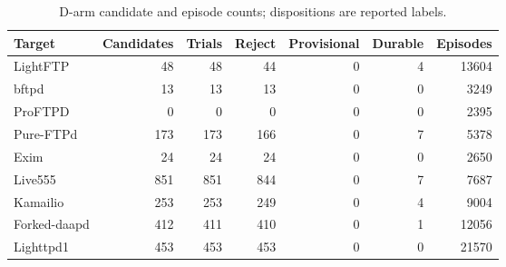 \begin{table}[!tbp]
\centering\small
\caption{D-arm candidate and episode counts; dispositions are reported labels.}
\label{tab:observed_log_counts}
\begin{tabular}{lrrrrrr}
\toprule
Target & Candidates & Trials & Reject & Provisional & Durable & Episodes \\
\midrule
LightFTP & 48 & 48 & 44 & 0 & 4 & 13604 \\
bftpd & 13 & 13 & 13 & 0 & 0 & 3249 \\
ProFTPD & 0 & 0 & 0 & 0 & 0 & 2395 \\
Pure-FTPd & 173 & 173 & 166 & 0 & 7 & 5378 \\
Exim & 24 & 24 & 24 & 0 & 0 & 2650 \\
Live555 & 851 & 851 & 844 & 0 & 7 & 7687 \\
Kamailio & 253 & 253 & 249 & 0 & 4 & 9004 \\
Forked-daapd & 412 & 411 & 410 & 0 & 1 & 12056 \\
Lighttpd1 & 453 & 453 & 453 & 0 & 0 & 21570 \\
\bottomrule
\end{tabular}
\end{table}
